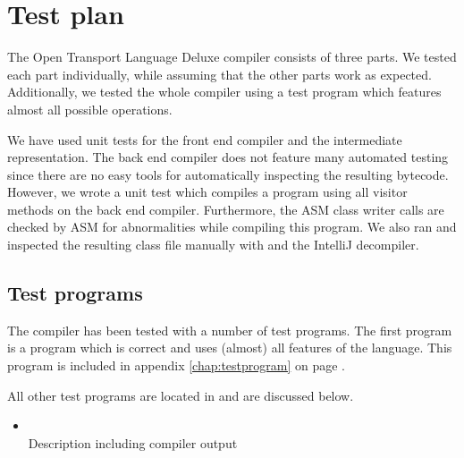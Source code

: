 \chapter{Test plan}

The Open Transport Language Deluxe compiler consists of three parts.
We tested each part individually, while assuming that the other parts work as expected.
Additionally, we tested the whole compiler using a test program which features almost all possible operations.

We have used unit tests for the front end compiler and the intermediate representation.
The back end compiler does not feature many automated testing since there are no easy tools for automatically inspecting the resulting bytecode.
However, we wrote a unit test which compiles a program using all visitor methods on the back end compiler.
Furthermore, the ASM class writer calls are checked by ASM for abnormalities while compiling this program.
We also ran and inspected the resulting class file manually with  and the IntelliJ decompiler.

\section{Test programs}

The compiler has been tested with a number of test programs. The first program is a program which is correct and uses (almost) all features of the language. This program is included in appendix \ref{chap:testprogram} on page \pageref{chap:testprogram}.

All other test programs are located in  and are discussed below.

\begin{itemize}
\item
	 \\
	Description including compiler output
\end{itemize}
